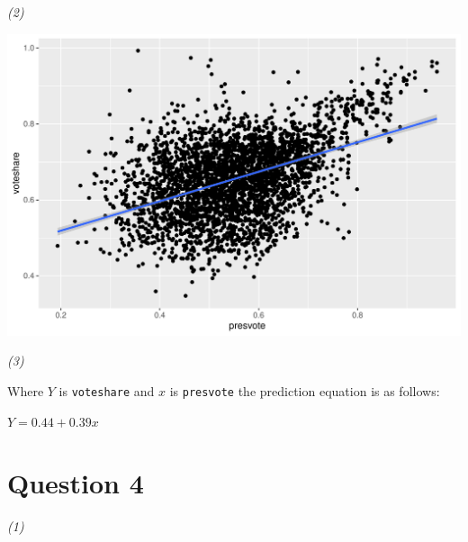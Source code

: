 \documentclass[12pt,letterpaper]{article}
\begin{document}
\clearpage

\textit{(2)}\\ 

\vspace{.25cm}

 
\includegraphics{vpPlot.pdf}
\vspace{.25cm}

\textit{(3)}\\ 
\vspace{.25cm}

\noindent Where $Y$ is \texttt{voteshare} and $x$ is \texttt{presvote} the prediction equation is as follows:

$Y = 0.44 + 0.39x$

\clearpage

\section*{Question 4}

\textit{(1)}\\ 

\vspace{.25cm}
\end{document}

